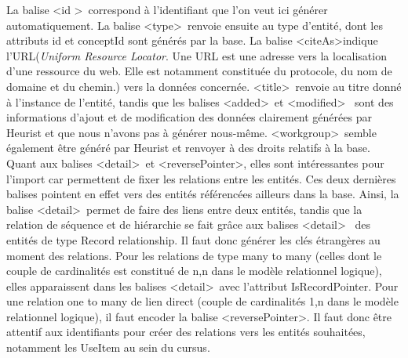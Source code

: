 \documentclass[a4paper,12pt,twoside]{book}
\begin{document}
La balise \textless id \textgreater~correspond à l'identifiant que l'on veut ici générer automatiquement. La balise \textless type\textgreater~renvoie ensuite au type d'entité, dont les attributs id et conceptId sont générés par la base. La balise \textless citeAs\textgreater indique l'URL(\textit{Uniform Resource Locator}. Une URL est une adresse vers la localisation d'une ressource du web. Elle est notamment constituée du protocole, du nom de domaine et du chemin.) vers la données concernée. \textless title\textgreater~renvoie au titre donné à l'instance de l'entité, tandis que les balises \textless added\textgreater~et \textless modified\textgreater~ sont des informations d'ajout et de modification des données clairement générées par Heurist et que nous n'avons pas à générer nous-même. \textless workgroup\textgreater~semble également être généré par Heurist et renvoyer à des droits relatifs à la base. Quant aux balises \textless detail\textgreater~et \textless reversePointer\textgreater , elles sont intéressantes pour l'import car permettent de fixer les relations entre les entités. Ces deux dernières balises pointent en effet vers des entités référencées ailleurs dans la base. Ainsi, la balise \textless detail\textgreater~permet de faire des liens entre deux entités, tandis que la relation de séquence et de hiérarchie se fait grâce aux balises \textless detail\textgreater
~des entités de type \og Record relationship\fg{}. Il faut donc générer les clés étrangères au moment des relations. Pour les relations de type \og many to many\fg{} (celles dont le couple de cardinalités est constitué de n,n dans le modèle relationnel logique), elles apparaissent dans les balises \textless detail\textgreater~avec l’attribut IsRecordPointer. Pour une relation \og one to many\fg{} de lien direct (couple de cardinalités 1,n dans le modèle relationnel logique), il faut encoder la balise \textless reversePointer\textgreater. Il faut donc 
être attentif aux identifiants pour créer des relations vers les entités souhaitées, notamment les UseItem au sein du cursus.\\
\end{document}

